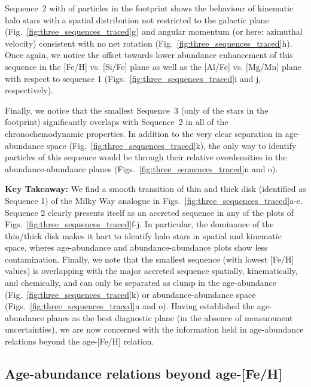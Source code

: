 \documentclass[fleqn,usenatbib]{mnras}
\begin{document}
Sequence~2 with  of particles in the footprint shows the behaviour of kinematic halo stars with a spatial distribution not restricted to the galactic plane (Fig.~\ref{fig:three_sequences_traced}g) and angular momentum (or here: azimuthal velocity) consistent with no net rotation (Fig.~\ref{fig:three_sequences_traced}h). Once again, we notice the offset towards lower abundance enhancement of this sequence in the [Fe/H] vs. [Si/Fe] plane as well as the [Al/Fe] vs. [Mg/Mn] plane with respect to sequence 1 (Figs.~\ref{fig:three_sequences_traced}i and j, respectively).

Finally, we notice that the smallest Sequence~3 (only  of the stars in the footprint) significantly overlaps with Sequence~2 in all of the chronochemodynamic properties. In addition to the very clear separation in age-abundance space (Fig.~\ref{fig:three_sequences_traced}k), the only way to identify particles of this sequence would be through their relative overdensities in the abundance-abundance planes (Figs.~\ref{fig:three_sequences_traced}n and o).

\textbf{Key Takeaway:} We find a smooth transition of thin and thick disk (identified as Sequence 1) of the Milky Way analogue in Figs.~\ref{fig:three_sequences_traced}a-e. Sequence 2 clearly presents itself as an accreted sequence in any of the plots of Figs.~\ref{fig:three_sequences_traced}f-j. In particular, the dominance of the thin/thick disk makes it hart to identify halo stars in spatial and kinematic space, wheres age-abundance and abundance-abundance plots show less contamination. Finally, we note that the smallest sequence (with lowest [Fe/H] values) is overlapping with the major accreted sequence spatially, kinematically, and chemically, and can only be separated as clump in the age-abundance (Fig.~\ref{fig:three_sequences_traced}k) or abundance-abundance space (Figs.~\ref{fig:three_sequences_traced}n and o). Having established the age-abundance planes as the best diagnostic plane (in the absence of measurement uncertainties), we are now concerned with the information held in age-abundance relations beyond the age-[Fe/H] relation.

\subsection{Age-abundance relations beyond age-[Fe/H]} \label{sec:age-abundance-sequences}
\end{document}
